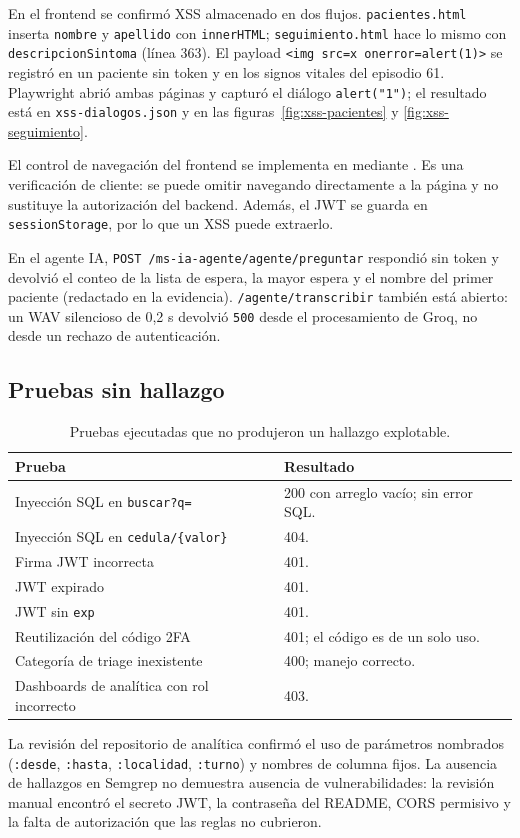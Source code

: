 En el frontend se confirmó XSS almacenado en dos flujos. \texttt{pacientes.html}
inserta \texttt{nombre} y \texttt{apellido} con \texttt{innerHTML};
\texttt{seguimiento.html} hace lo mismo con \texttt{descripcionSintoma} (línea
363). El payload \texttt{<img src=x onerror=alert(1)>} se registró en un paciente
sin token y en los signos vitales del episodio 61. Playwright abrió ambas páginas
y capturó el diálogo \texttt{alert("1")}; el resultado está en
\texttt{xss-dialogos.json} y en las figuras~\ref{fig:xss-pacientes} y
\ref{fig:xss-seguimiento}.

El control de navegación del frontend se implementa en
 mediante . Es una
verificación de cliente: se puede omitir navegando directamente a la página y no
sustituye la autorización del backend. Además, el JWT se guarda en
\texttt{sessionStorage}, por lo que un XSS puede extraerlo.

En el agente IA, \texttt{POST /ms-ia-agente/agente/preguntar} respondió sin token
y devolvió el conteo de la lista de espera, la mayor espera y el nombre del primer
paciente (redactado en la evidencia). \texttt{/agente/transcribir} también está
abierto: un WAV silencioso de 0,2 s devolvió \texttt{500} desde el procesamiento
de Groq, no desde un rechazo de autenticación.

\subsection{Pruebas sin hallazgo}

\begin{table}[htbp]
\centering
\caption{Pruebas ejecutadas que no produjeron un hallazgo explotable.}
\label{tab:sin-hallazgo}
\small
\setlength{\tabcolsep}{4pt}
\begin{tabular}{@{}L{8.7cm}L{6.4cm}@{}}
\toprule
\textbf{Prueba} & \textbf{Resultado}\\
\midrule
Inyección SQL en \texttt{buscar?q=} & 200 con arreglo vacío; sin error SQL.\\
Inyección SQL en \texttt{cedula/\{valor\}} & 404.\\
Firma JWT incorrecta & 401.\\
JWT expirado & 401.\\
JWT sin \texttt{exp} & 401.\\
Reutilización del código 2FA & 401; el código es de un solo uso.\\
Categoría de triage inexistente & 400; manejo correcto.\\
Dashboards de analítica con rol incorrecto & 403.\\
\bottomrule
\end{tabular}
\end{table}

La revisión del repositorio de analítica confirmó el uso de parámetros nombrados
(\texttt{:desde}, \texttt{:hasta}, \texttt{:localidad}, \texttt{:turno}) y
nombres de columna fijos. La ausencia de hallazgos en Semgrep
no demuestra ausencia de vulnerabilidades: la revisión manual encontró el secreto
JWT, la contraseña del README, CORS permisivo y la falta de autorización que las
reglas no cubrieron.

